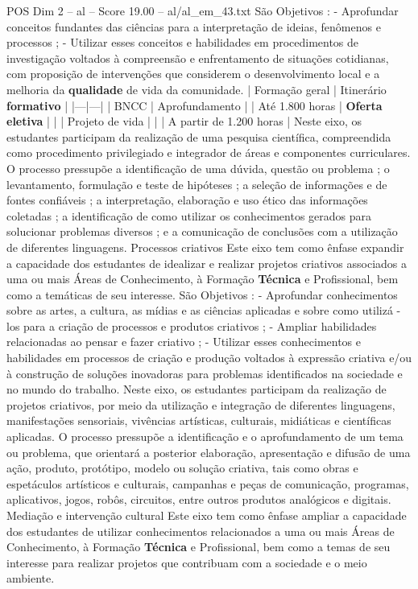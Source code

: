 \begin{textsample}{POS Dim 2 – al – Score 19.00 – al/al\_em\_43.txt}
São Objetivos : - Aprofundar conceitos fundantes das ciências para a interpretação de ideias, fenômenos e processos ; - Utilizar esses conceitos e habilidades em procedimentos de investigação voltados à compreensão e enfrentamento de situações cotidianas, com proposição de intervenções que considerem o desenvolvimento local e a melhoria da \textbf{qualidade} de vida da comunidade. | Formação geral | Itinerário \textbf{formativo} | |---|---| | BNCC | Aprofundamento | | Até 1.800 horas | \textbf{Oferta} \textbf{eletiva} | | | Projeto de vida | | | A partir de 1.200 horas | Neste eixo, os estudantes participam da realização de uma pesquisa científica, compreendida como procedimento privilegiado e integrador de áreas e componentes curriculares.
O processo pressupõe a identificação de uma dúvida, questão ou problema ; o levantamento, formulação e teste de hipóteses ; a seleção de informações e de fontes confiáveis ; a interpretação, elaboração e uso ético das informações coletadas ; a identificação de como utilizar os conhecimentos gerados para solucionar problemas diversos ; e a comunicação de conclusões com a utilização de diferentes linguagens.
Processos criativos Este eixo tem como ênfase expandir a capacidade dos estudantes de idealizar e realizar projetos criativos associados a uma ou mais Áreas de Conhecimento, à Formação \textbf{Técnica} e Profissional, bem como a temáticas de seu interesse.
São Objetivos : - Aprofundar conhecimentos sobre as artes, a cultura, as mídias e as ciências aplicadas e sobre como utilizá -los para a criação de processos e produtos criativos ; - Ampliar habilidades relacionadas ao pensar e fazer criativo ; - Utilizar esses conhecimentos e habilidades em processos de criação e produção voltados à expressão criativa e/ou à construção de soluções inovadoras para problemas identificados na sociedade e no mundo do trabalho.
Neste eixo, os estudantes participam da realização de projetos criativos, por meio da utilização e integração de diferentes linguagens, manifestações sensoriais, vivências artísticas, culturais, midiáticas e científicas aplicadas.
O processo pressupõe a identificação e o aprofundamento de um tema ou problema, que orientará a posterior elaboração, apresentação e difusão de uma ação, produto, protótipo, modelo ou solução criativa, tais como obras e espetáculos artísticos e culturais, campanhas e peças de comunicação, programas, aplicativos, jogos, robôs, circuitos, entre outros produtos analógicos e digitais.
Mediação e intervenção cultural Este eixo tem como ênfase ampliar a capacidade dos estudantes de utilizar conhecimentos relacionados a uma ou mais Áreas de Conhecimento, à Formação \textbf{Técnica} e Profissional, bem como a temas de seu interesse para realizar projetos que contribuam com a sociedade e o meio ambiente.

\end{textsample}
